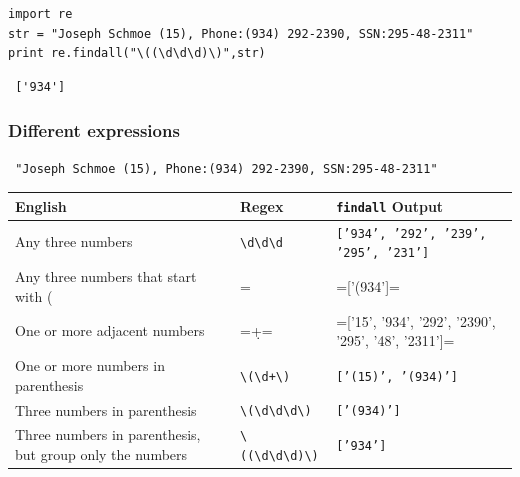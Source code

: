 \documentclass[11pt]{article}
\begin{document}
\begin{verbatim}
import re
str = "Joseph Schmoe (15), Phone:(934) 292-2390, SSN:295-48-2311"  
print re.findall("\((\d\d\d)\)",str)
\end{verbatim}

\begin{verbatim}
 ['934']
\end{verbatim}

    
\subsubsection{Different expressions}
\label{sec-3-1-2}

\begin{verbatim}
 "Joseph Schmoe (15), Phone:(934) 292-2390, SSN:295-48-2311"  
\end{verbatim}

\begin{center}
\begin{tabular}{l|l|l}
 English                                                   &  Regex                                                                                             &  \texttt{findall} Output                              \\
\hline
 Any three numbers                                         &  \texttt{\textbackslash{}d\textbackslash{}d\textbackslash{}d}                                      &  \texttt{['934', '292', '239', '295', '231']}         \\
 Any three numbers that start with (                       &  =\(\d\d\d=                                                                                        &  =['(934']=                                           \\
 One or more adjacent numbers                              &  =\d+=                                                                                             &  =['15', '934', '292', '2390', '295', '48', '2311']=  \\
 One or more numbers in parenthesis                        &  \texttt{\textbackslash{}(\textbackslash{}d+\textbackslash{})}                                     &  \texttt{['(15)', '(934)']}                           \\
 Three numbers in parenthesis                              &  \texttt{\textbackslash{}(\textbackslash{}d\textbackslash{}d\textbackslash{}d\textbackslash{})}    &  \texttt{['(934)']}                                   \\
 Three numbers in parenthesis, but group only the numbers  &  \texttt{\textbackslash{}((\textbackslash{}d\textbackslash{}d\textbackslash{}d)\textbackslash{})}  &  \texttt{['934']}                                     \\
\end{tabular}
\end{center}
\end{document}
